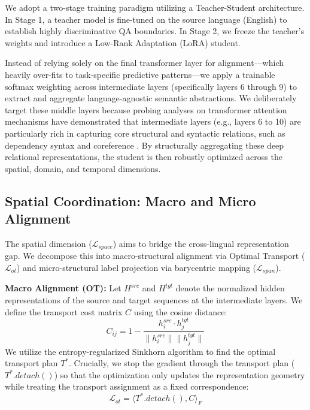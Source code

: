 \documentclass[11pt]{article}
\begin{document}
We adopt a two-stage training paradigm utilizing a Teacher-Student architecture. In Stage 1, a teacher model is fine-tuned on the source language (English) to establish highly discriminative QA boundaries. In Stage 2, we freeze the teacher's weights and introduce a Low-Rank Adaptation (LoRA) student. 

Instead of relying solely on the final transformer layer for alignment—which heavily over-fits to task-specific predictive patterns—we apply a trainable softmax weighting across intermediate layers (specifically layers 6 through 9) to extract and aggregate language-agnostic semantic abstractions. We deliberately target these middle layers because probing analyses on transformer attention mechanisms have demonstrated that intermediate layers (e.g., layers 6 to 10) are particularly rich in capturing core structural and syntactic relations, such as dependency syntax and coreference \cite{clark-etal-2019-bert}. By structurally aggregating these deep relational representations, the student is then robustly optimized across the spatial, domain, and temporal dimensions.

\subsection{Spatial Coordination: Macro and Micro Alignment}
The spatial dimension ($\mathcal{L}_{space}$) aims to bridge the cross-lingual representation gap. We decompose this into macro-structural alignment via Optimal Transport ($\mathcal{L}_{ot}$) and micro-structural label projection via barycentric mapping ($\mathcal{L}_{span}$).

\textbf{Macro Alignment (OT):} Let $H^{src}$ and $H^{tgt}$ denote the normalized hidden representations of the source and target sequences at the intermediate layers. We define the transport cost matrix $C$ using the cosine distance:
$$ C_{ij} = 1 - \frac{h^{src}_i \cdot h^{tgt}_j}{\|h^{src}_i\| \|h^{tgt}_j\|} $$
We utilize the entropy-regularized Sinkhorn algorithm to find the optimal transport plan $T^*$. Crucially, we stop the gradient through the transport plan ($T^*.detach()$) so that the optimization only updates the representation geometry while treating the transport assignment as a fixed correspondence:
$$ \mathcal{L}_{ot} = \langle T^*.detach(), C \rangle_F $$
\end{document}
